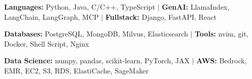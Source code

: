 %
\item\small{\textbf{Languages:} Python, Java, C/C++, TypeScript $|$ \textbf{GenAI:} LlamaIndex, LangChain, LangGraph, MCP $|$ \textbf{Fullstack:} Django, FastAPI, React}
\item\small{\textbf{Databases:} PostgreSQL, MongoDB, Milvus, Elasticsearch $|$ \textbf{Tools:} nvim, git, Docker, Shell Script, Nginx}
\item\small{\textbf{Data Science:} numpy, pandas, scikit-learn, PyTorch, JAX $|$ \textbf{AWS:} Bedrock, EMR, EC2, S3, RDS, ElastiCache, SageMaker}%
